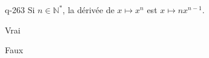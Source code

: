 \begin{truefalse}{q-263}
Si $n \in \mathbb N^*$, la dérivée de $x\mapsto x^n$ est $x\mapsto nx^{n-1}$.
\item* Vrai
\item Faux
\end{truefalse}

